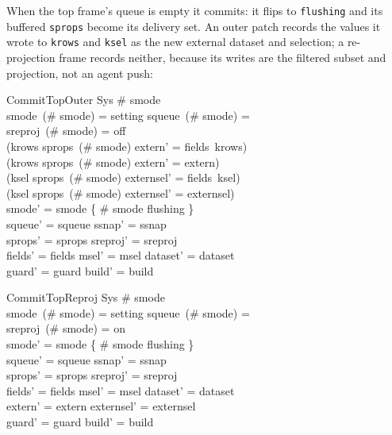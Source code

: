 \documentclass[a4paper,10pt,fleqn]{article}
\begin{document}
When the top frame's queue is empty it commits: it flips to \texttt{flushing} and
its buffered \texttt{sprops} become its delivery set.  An outer patch records the
values it wrote to \texttt{krows} and \texttt{ksel} as the new external dataset
and selection; a re-projection frame records neither, because its writes are the
filtered subset and projection, not an agent push:

\begin{schema}{CommitTopOuter}
  \Delta Sys
\where
  \# smode  \\
  smode~(\# smode) = setting \land squeue~(\# smode) = \langle \rangle \\
  sreproj~(\# smode) = off \\
  (krows \in sprops~(\# smode) \implies extern' = fields~krows) \\
  \land (krows \notin sprops~(\# smode) \implies extern' = extern) \\
  (ksel \in sprops~(\# smode) \implies externsel' = fields~ksel) \\
  \land (ksel \notin sprops~(\# smode) \implies externsel' = externsel) \\
  smode' = smode \oplus \{ \# smode \mapsto flushing \} \\
  squeue' = squeue \land ssnap' = ssnap \\
  \land sprops' = sprops \land sreproj' = sreproj \\
  fields' = fields \land msel' = msel \land dataset' = dataset \\
  \land guard' = guard \land build' = build
\end{schema}

\begin{schema}{CommitTopReproj}
  \Delta Sys
\where
  \# smode  \\
  smode~(\# smode) = setting \land squeue~(\# smode) = \langle \rangle \\
  sreproj~(\# smode) = on \\
  smode' = smode \oplus \{ \# smode \mapsto flushing \} \\
  squeue' = squeue \land ssnap' = ssnap \\
  \land sprops' = sprops \land sreproj' = sreproj \\
  fields' = fields \land msel' = msel \land dataset' = dataset \\
  \land extern' = extern \land externsel' = externsel \\
  \land guard' = guard \land build' = build
\end{schema}
\end{document}
